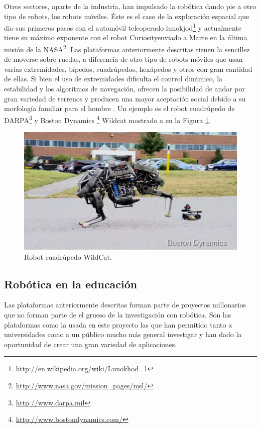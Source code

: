 \documentclass[12pt,a4paper,final,twoside]{book}
\begin{document}
Otros sectores, aparte de la industria, han impulsado la robótica dando pie a otro tipo de robots, los robots móviles. Éste es el caso de la exploración espacial que dio sus primeros pasos con el automóvil teleoperado lunokjod\footnote{\url{http://en.wikipedia.org/wiki/Lunokhod_1}} y actualmente tiene su máximo exponente con el robot Curiosityenviado a Marte en la última misión de la NASA\footnote{\url{http://www.nasa.gov/mission_pages/msl/}}. Las plataformas anteriormente descritas tienen la sencillez de moverse sobre ruedas, a diferencia de otro tipo de robots móviles que usan varias extremidades, bípedos, cuadrúpedos, hexápedos y otros con gran cantidad de ellas. Si bien el uso de extremidades dificulta el control dinámico, la estabilidad y los algoritmos de  navegación, ofrecen la posibilidad de andar por gran variedad de terrenos y producen una mayor aceptación social debido a su morfología familiar para el hombre . Un ejemplo es el robot cuadrúpedo de DARPA\footnote{\url{http://www.darpa.mil}} y Boston Dynamics \footnote{\url{http://www.bostondynamics.com/}} Wildcat mostrado a en la Figura \ref{fig:wildcat}.

\begin{figure}[h!]
	\centering
    \includegraphics[scale=0.6]	{images/Wildcat.jpg}
	 \caption{Robot cuadrúpedo WildCat.}
  \label{fig:wildcat}
\end{figure}

\subsection{Robótica en la educación}

Las plataformas anteriormente descritas forman parte de proyectos millonarios que no forman parte de el grueso de la investigación con robótica.
Son las plataformas como la usada en este proyecto las que han permitido tanto a universidades como a un público mucho más general investigar y han dado la oportunidad de crear una gran variedad de aplicaciones.
\end{document}
